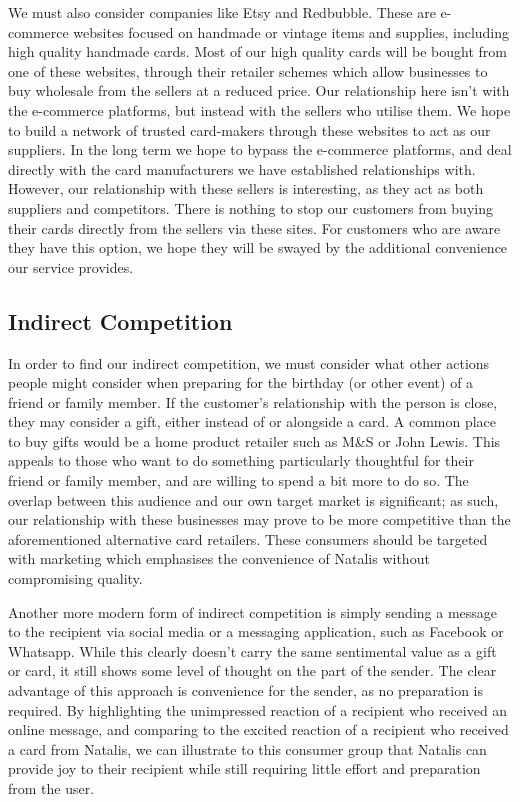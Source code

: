 \documentclass[10pt, a4paper]{article}
\begin{document}
We must also consider companies like Etsy and Redbubble. These are e-commerce websites focused on handmade or vintage items and supplies, including high quality handmade cards. Most of our high quality cards will be bought from one of these websites, through their retailer schemes which allow businesses to buy wholesale from the sellers at a reduced price. Our relationship here isn't with the e-commerce platforms, but instead with the sellers who utilise them. We hope to build a network of trusted card-makers through these websites to act as our suppliers. In the long term we hope to bypass the e-commerce platforms, and deal directly with the card manufacturers we have established relationships with. However, our relationship with these sellers is interesting, as they act as both suppliers and competitors. There is nothing to stop our customers from buying their cards directly from the sellers via these sites. For customers who are aware they have this option, we hope they will be swayed by the additional convenience our service provides.

\subsection*{Indirect Competition}

In order to find our indirect competition, we must consider what other actions people might consider when preparing for the birthday (or other event) of a friend or family member. If the customer's relationship with the person is close, they may consider a gift, either instead of or alongside a card. A common place to buy gifts would be a home product retailer such as M\&S or John Lewis. This appeals to those who want to do something particularly thoughtful for their friend or family member, and are willing to spend a bit more to do so. The overlap between this audience and our own target market is significant; as such, our relationship with these businesses may prove to be more competitive than the aforementioned alternative card retailers. These consumers should be targeted with marketing which emphasises the convenience of Natalis without compromising quality.

Another more modern form of indirect competition is simply sending a message to the recipient via social media or a messaging application, such as Facebook or Whatsapp. While this clearly doesn't carry the same sentimental value as a gift or card, it still shows some level of thought on the part of the sender. The clear advantage of this approach is convenience for the sender, as no preparation is required. By highlighting the unimpressed reaction of a recipient who received an online message, and comparing to the excited reaction of a recipient who received a card from Natalis, we can illustrate to this consumer group that Natalis can provide joy to their recipient while still requiring little effort and preparation from the user.
\end{document}
